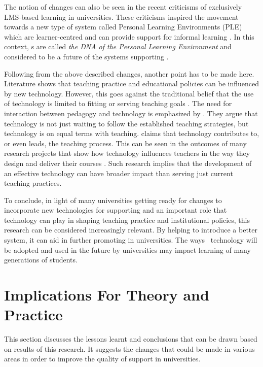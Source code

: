 The notion of changes can also be seen in the recent criticisms of exclusively
LMS-based learning in universities. These criticisms inspired the movement
towards a new type of system called Personal Learning Environments (PLE) which
are learner-centred and can provide support for informal learning
\citep{Calvani2007}. In this context, \ep s are called \textit{the DNA of the
Personal Learning Environment} and considered to be a future of the systems
supporting \LLLs \citep{Attwell2007a}.

Following from the above described changes, another point has to be made here.
Literature shows that teaching practice and educational policies can be
influenced by new technology. However, this goes against the traditional belief
that the use of technology is limited to fitting or serving teaching goals
\citep{Levin2008}. The need for interaction between pedagogy and technology is
emphasized by \citet{Savin-Baden2006}. They argue that technology is not just
waiting to follow the established teaching strategies, but technology is on
equal terms with teaching. \citet{Cousin2005} claims that technology contributes
to, or even leads, the teaching process. This can be seen in the outcomes of
many research projects that show how technology influences teachers in the way
they design and deliver their courses \citep{Rutledge2012,Wang2002}. Such
research implies that the development of an effective technology can have
broader impact than serving just current teaching practices.

To conclude, in light of many universities getting ready for changes to
incorporate new technologies for supporting \LLLs and an important role that
technology can play in shaping teaching practice and institutional policies,
this research can be considered increasingly relevant. By helping to introduce a
better system, it can aid in further promoting \LLLs in universities. The ways
\ep~technology will be adopted and used in the future by universities may impact
learning of many generations of students.

\section{Implications For Theory and Practice}

This section discusses the lessons learnt and conclusions that can be drawn
based on results of this research. It suggests the changes that could be made in
various areas in order to improve the quality of \LLLs support in universities.

